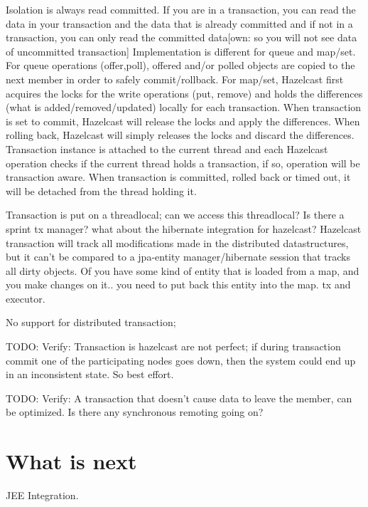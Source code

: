 Isolation is always read committed. If you are in a transaction, you can read the data in your transaction and the data that is already committed and if not in a transaction, you can only read the committed data[own: so you will not see data of uncommitted transaction] Implementation is different for queue and map/set. For queue operations (offer,poll), offered and/or polled objects are copied to the next member in order to safely commit/rollback. For map/set, Hazelcast first acquires the locks for the write operations (put, remove) and holds the differences (what is added/removed/updated) locally for each transaction. When transaction is set to commit, Hazelcast will release the locks and apply the differences. When rolling back, Hazelcast will simply releases the locks and discard the differences. Transaction instance is attached to the current thread and each Hazelcast operation checks if the current thread holds a transaction, if so, operation will be transaction aware. When transaction is committed, rolled back or timed out, it will be detached from the thread holding it.

Transaction is put on a threadlocal; can we access this threadlocal?
Is there a sprint tx manager?
what about the hibernate integration for hazelcast?
Hazelcast transaction will track all modifications made in the distributed datastructures, but it can't be compared to a jpa-entity manager/hibernate session that tracks all dirty objects. Of you have some kind of entity that is loaded from a map, and you make changes on it.. you need to put back this entity into the map. 
tx and executor.

No support for distributed transaction; 

TODO: Verify: Transaction is hazelcast are not perfect; if during transaction commit one of the participating nodes goes down, then the system could end up in an inconsistent state. So best effort.

TODO: Verify: A transaction that doesn't cause data to leave the member, can be optimized. Is there any synchronous remoting going on? 

\section{What is next}
JEE Integration.